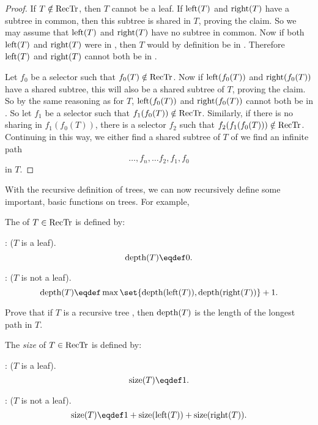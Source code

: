 \begin{proof}
If $T \notin \text{RecTr}$, then $T$ cannot be a leaf.  If $\text{left}(T)$
and $\text{right}(T)$ have a subtree in common, then this subtree is
shared in $T$, proving the claim.  So we may assume that
$\text{left}(T)$ and $\text{right}(T)$ have no subtree in common.  Now
if both $\text{left}(T)$ and $\text{right}(T)$ were in \rectr, then $T$
would by definition be in \rectr.  Therefore $\text{left}(T)$ and $\text{right}(T)$
cannot both be in \rectr.

Let $f_0$ be a selector such that $f_0(T) \notin \text{RecTr}$.  Now if
$\text{left}(f_0(T))$ and $\text{right}(f_0(T))$ have a shared subtree, this
will also be a shared subtree of $T$, proving the claim.  So by the
same reasoning as for $T$, $\text{left}(f_0(T))$ and $\text{right}(f_0(T))$
cannot both be in \rectr.  So let $f_1$ be a selector such that
$f_1(f_0(T)) \notin \text{RecTr}$.  Similarly, if there is no sharing in
$f_1(f_0(T))$, there is a selector $f_2$ such that $f_2(f_1(f_0(T)))
\notin \text{RecTr}$.  Continuing in this way, we either find a shared subtree of $T$ of we
find an infinite path
\[
\dots,f_n,\dots f_2,f_1,f_0
\]
in $T$.
\end{proof}

With the recursive definition of trees, we can now recursively define
some important, basic functions on trees.  For example,

\begin{definition}
The  of $T \in \text{RecTr}$ is defined by:

: ($T$ is a leaf).
\[
\trdpth{T} \eqdef 0.
\]

: ($T$ is not a leaf).
\[
\trdpth{T} \eqdef \max\set{\trdpth{\leftsub{(T)}}, \trdpth{\rightsub{(T)}}} + 1.
\]
\end{definition}

\begin{problem}
Prove that if $T$ is a recursive tree \rectr, then $\text{depth}(T)$ is the
length of the longest path in $T$.
\begin{solution}
\end{solution}
\end{problem}

\begin{definition}
The \emph{size} of $T \in \text{RecTr}$ is defined by:

: ($T$ is a leaf).
\[
\sizetr{T} \eqdef 1.
\]

: ($T$ is not a leaf).
\[
\sizetr{T} \eqdef 1 + \sizetr{\leftsub{(T)}} + \sizetr{\rightsub{(T)}}.
\]
\end{definition}

